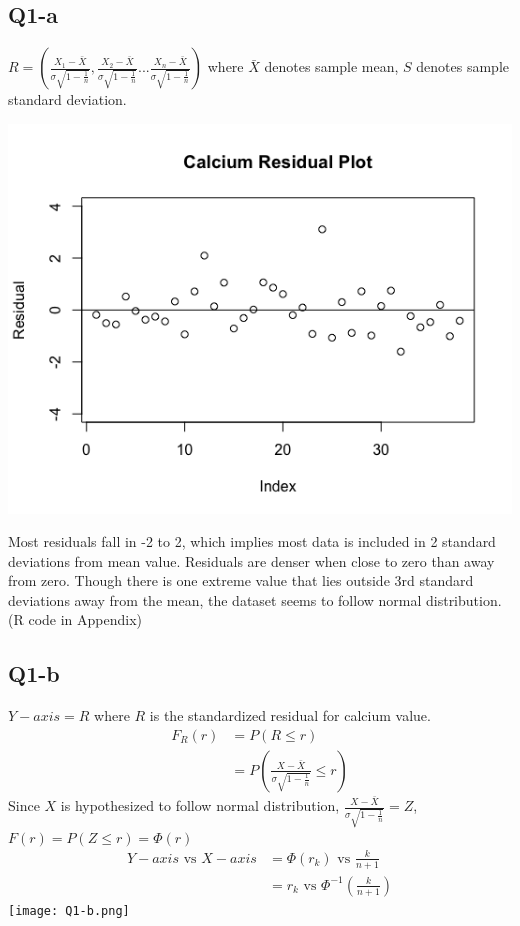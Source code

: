 \documentclass[11pt,letterpaper]{article}
\begin{document}
\subsection*{Q1-a}
\noindent $R = (\frac{X_1 - \bar{X}}{\sigma \sqrt{1 - \frac{1}{n}}}, \frac{X_2 - \bar{X}}{\sigma \sqrt{1 - \frac{1}{n}}}...\frac{X_n - \bar{X}}{\sigma \sqrt{1 - \frac{1}{n}}})$ where $\bar{X}$ denotes sample mean, $S$ denotes sample standard deviation. 

\includegraphics[scale=0.6]{q1-a.png}

\noindent Most residuals fall in -2 to 2, which implies most data is included in 2 standard deviations from mean value. Residuals are denser when close to zero than away from zero. Though there is one extreme value that lies outside 3rd standard deviations away from the mean, the dataset seems to follow normal distribution.\\

\noindent (R code in Appendix)

\subsection*{Q1-b}
\noindent $Y-axis = R$ where $R$ is the standardized residual for calcium value. 
\begin{align*}
F_R(r) &= P(R \leq r) \\
&= P(\frac{X - \bar{X}}{\sigma \sqrt{1 - \frac{1}{n}}} \leq r) 
\end{align*}
\noindent Since $X$ is hypothesized to follow normal distribution, $\frac{X - \bar{X}}{\sigma \sqrt{1 - \frac{1}{n}}} = Z$, $F(r) = P(Z \leq r) = \Phi(r)$
\begin{align*}
Y-axis \text{ vs } X-axis &= \Phi(r_k) \text{ vs } \frac{k}{n+1} \\
&= r_k \text{ vs } \Phi^{-1}(\frac{k}{n + 1})
\end{align*}
\texttt{[image: Q1-b.png]}
\end{document}
